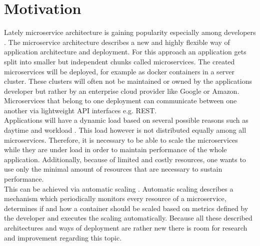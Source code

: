 \documentclass[
	ngerman,
	ruledheaders=section,%
	class=report,%
	thesis={type=master},%
	accentcolor=8c,%
	custommargins=false,%
	marginpar=false,%
	parskip=half-,%
	fontsize=11pt,%
]{tudapub}
\begin{document}
\section{Motivation}
Lately microservice architecture is gaining popularity especially among developers \cite{alshuqayran2016systematic}. The
microservice architecture describes a new and highly flexible way of application architecture and
deployment. For this approach an application gets split into smaller but independent chunks called
microservices. The created microservices will be deployed, for example as docker containers in a
server cluster. These clusters will often not be maintained or owned by the applications developer
but rather by an enterprise cloud provider like Google or Amazon. Microservices that belong to
one deployment can communicate between one another via lightweight API interfaces e.g. REST.\\
\newline
Applications will have a dynamic load based on several possible reasons such as daytime and
workload \cite{villamizar2015evaluating}. This load however is not distributed equally among all microservices. Therefore, it
is necessary to be able to scale the microservices while they are under load in order to maintain
performance of the whole application. Additionally, because of limited and costly resources, one
wants to use only the minimal amount of resources that are necessary to sustain performance.\\
\newline
This can be achieved via automatic scaling \cite{rossi2019horizontal}. Automatic scaling describes a mechanism which
periodically monitors every resource of a microservice, determines if and how a container should
be scaled based on metrics defined by the developer and executes the scaling automatically.
Because all these described architectures and ways of deployment are rather new there is room
for research and improvement regarding this topic.\\
\newpage
\end{document}
